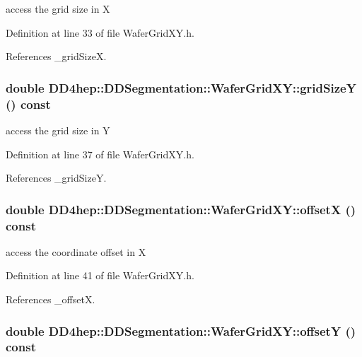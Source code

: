access the grid size in X 

Definition at line 33 of file WaferGridXY.h.

References \_\-gridSizeX.\hypertarget{class_d_d4hep_1_1_d_d_segmentation_1_1_wafer_grid_x_y_a44872fa49d2809f7da860e3c32d7d666}{
\subsubsection[{gridSizeY}]{\setlength{\rightskip}{0pt plus 5cm}double DD4hep::DDSegmentation::WaferGridXY::gridSizeY () const}}
\label{class_d_d4hep_1_1_d_d_segmentation_1_1_wafer_grid_x_y_a44872fa49d2809f7da860e3c32d7d666}


access the grid size in Y 

Definition at line 37 of file WaferGridXY.h.

References \_\-gridSizeY.\hypertarget{class_d_d4hep_1_1_d_d_segmentation_1_1_wafer_grid_x_y_a7f671c74b1fdf22b5fb8f755b57cbaa6}{
\subsubsection[{offsetX}]{\setlength{\rightskip}{0pt plus 5cm}double DD4hep::DDSegmentation::WaferGridXY::offsetX () const}}
\label{class_d_d4hep_1_1_d_d_segmentation_1_1_wafer_grid_x_y_a7f671c74b1fdf22b5fb8f755b57cbaa6}


access the coordinate offset in X 

Definition at line 41 of file WaferGridXY.h.

References \_\-offsetX.\hypertarget{class_d_d4hep_1_1_d_d_segmentation_1_1_wafer_grid_x_y_ae609c3cc10a490418e3913ccfa9246de}{
\subsubsection[{offsetY}]{\setlength{\rightskip}{0pt plus 5cm}double DD4hep::DDSegmentation::WaferGridXY::offsetY () const}}
\label{class_d_d4hep_1_1_d_d_segmentation_1_1_wafer_grid_x_y_ae609c3cc10a490418e3913ccfa9246de}


